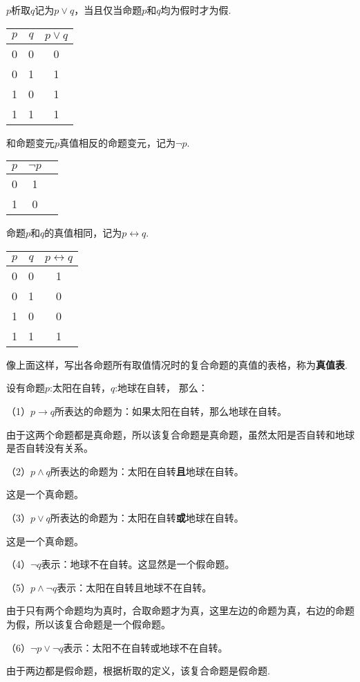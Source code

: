 \begin{definition}[析取]
    $p$析取$q$记为$p \vee q$，当且仅当命题$p$和$q$均为假时才为假.
\end{definition}
\begin{tabular}{c|c|c}
    $p$ & $q$ & $p \vee q$ \\
    \hline
    0 & 0 & 0 \\
    0 & 1 & 1 \\
    1 & 0 & 1 \\
    1 & 1 & 1
\end{tabular}

\begin{definition}[否定]
    和命题变元$p$真值相反的命题变元，记为$\neg p$.
\end{definition}
\begin{tabular}{c|c|c}
    $p$ & $\neg p$  \\
    \hline
    0 & 1  \\
    1 & 0 
\end{tabular}

\begin{definition}[双条件]
    命题$p$和$q$的真值相同，记为$p \leftrightarrow q$.
\end{definition}
\begin{tabular}{c|c|c}
    $p$ & $q$ & $p \leftrightarrow q$ \\
    \hline
    0 & 0 & 1 \\
    0 & 1 & 0 \\
    1 & 0 & 0 \\
    1 & 1 & 1
\end{tabular}

像上面这样，写出各命题所有取值情况时的复合命题的真值的表格，称为\textbf{真值表}.

\begin{example}
    设有命题$p$:太阳在自转，$q$:地球在自转，
    那么：

    （1）$p \to q$所表达的命题为：如果太阳在自转，那么地球在自转。\par
    由于这两个命题都是真命题，所以该复合命题是真命题，虽然太阳是否自转和地球是否自转没有关系。

    （2）$p \wedge q$所表达的命题为：太阳在自转\textbf{且}地球在自转。\par
    这是一个真命题。

    （3）$p \vee q$所表达的命题为：太阳在自转\textbf{或}地球在自转。\par
    这是一个真命题。

    （4）$\neg q$表示：地球不在自转。这显然是一个假命题。

    （5）$p \wedge \neg q$表示：太阳在自转且地球不在自转。\par
    由于只有两个命题均为真时，合取命题才为真，这里左边的命题为真，右边的命题为假，所以该复合命题是一个假命题。

    （6）$\neg p \vee \neg q$表示：太阳不在自转或地球不在自转。\par
    由于两边都是假命题，根据析取的定义，该复合命题是假命题.
\end{example}

